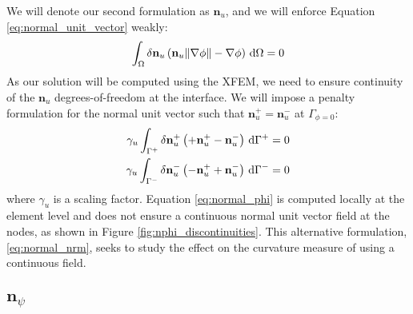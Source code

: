 We will denote our second formulation as $\mathbf{n}_{u}$, and we will enforce Equation \ref{eq:normal_unit_vector} weakly:
%
\begin{equation}
	\centering
	\label{eq:normal_nrm}
	\int_{\Omega} \delta \mathbf{n}_{u} \left( \mathbf{n}_{u} \Vert \nabla \phi \Vert - \nabla \phi \right)\,\mathrm{d}\Omega = 0
\end{equation}
%
As our solution will be computed using the XFEM, we need to ensure continuity of the $\mathbf{n}_{u}$ degrees-of-freedom at the interface. We will impose a penalty formulation for the normal unit vector such that $\mathbf{n}_{u}^{+} = \mathbf{n}_{u}^{-}$ at $\Gamma_{\phi=0}$:
%
\begin{equation}
	\centering
	\label{eq:normal_nrm_interface}
	\begin{split}
	\gamma_{u} \int_{\Gamma^{+}} \delta \mathbf{n}_{u}^{+} \left( +\mathbf{n}_{u}^{+} - \mathbf{n}_{u}^{-} \right)\,\mathrm{d}\Gamma^{+} = 0 \\
	\gamma_{u} \int_{\Gamma^{-}} \delta \mathbf{n}_{u}^{-} \left( -\mathbf{n}_{u}^{+} + \mathbf{n}_{u}^{-}  \right)\,\mathrm{d}\Gamma^{-} = 0
	\end{split}
\end{equation}
%
where $\gamma_{u}$ is a scaling factor. Equation \ref{eq:normal_phi} is computed locally at the element level and does not ensure a continuous normal unit vector field at the nodes, as shown in Figure \ref{fig:nphi_discontinuities}. This alternative formulation, \ref{eq:normal_nrm}, seeks to study the effect on the curvature measure of using a continuous field.


\subsection{$\mathbf{n}_{\psi}$}
\label{sec:npsi}

